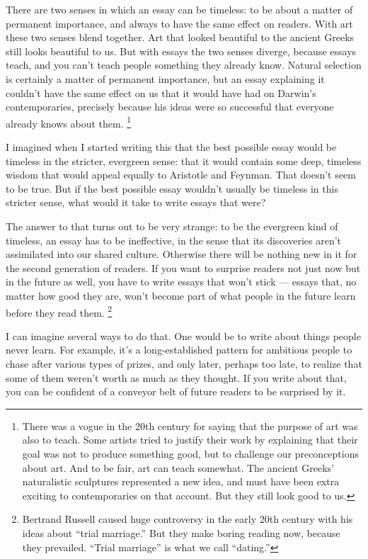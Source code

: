 \documentclass[12pt]{book}
\begin{document}
There are two senses in which an essay can be timeless: to be about a
matter of permanent importance, and always to have the same effect on
readers. With art these two senses blend together. Art that looked
beautiful to the ancient Greeks still looks beautiful to us. But with
essays the two senses diverge, because essays teach, and you can't teach
people something they already know. Natural selection is certainly a
matter of permanent importance, but an essay explaining it couldn't have
the same effect on us that it would have had on Darwin's contemporaries,
precisely because his ideas were so successful that everyone already
knows about them. \footnote{There was a vogue in the 20th century for saying that the
purpose of art was also to teach. Some artists tried to justify their
work by explaining that their goal was not to produce something good,
but to challenge our preconceptions about art. And to be fair, art can
teach somewhat. The ancient Greeks' naturalistic sculptures represented
a new idea, and must have been extra exciting to contemporaries on that
account. But they still look good to us.}

I imagined when I started writing this that the best possible essay
would be timeless in the stricter, evergreen sense: that it would
contain some deep, timeless wisdom that would appeal equally to
Aristotle and Feynman. That doesn't seem to be true. But if the best
possible essay wouldn't usually be timeless in this stricter sense, what
would it take to write essays that were?

The answer to that turns out to be very strange: to be the evergreen
kind of timeless, an essay has to be ineffective, in the sense that its
discoveries aren't assimilated into our shared culture. Otherwise there
will be nothing new in it for the second generation of readers. If you
want to surprise readers not just now but in the future as well, you
have to write essays that won't stick --- essays that, no matter how
good they are, won't become part of what people in the future learn
before they read them. \footnote{Bertrand Russell caused huge controversy in the early 20th
century with his ideas about ``trial marriage.'' But they make boring
reading now, because they prevailed. ``Trial marriage'' is what we call
``dating.''}

I can imagine several ways to do that. One would be to write about
things people never learn. For example, it's a long-established pattern
for ambitious people to chase after various types of prizes, and only
later, perhaps too late, to realize that some of them weren't worth as
much as they thought. If you write about that, you can be confident of a
conveyor belt of future readers to be surprised by it.
\end{document}
